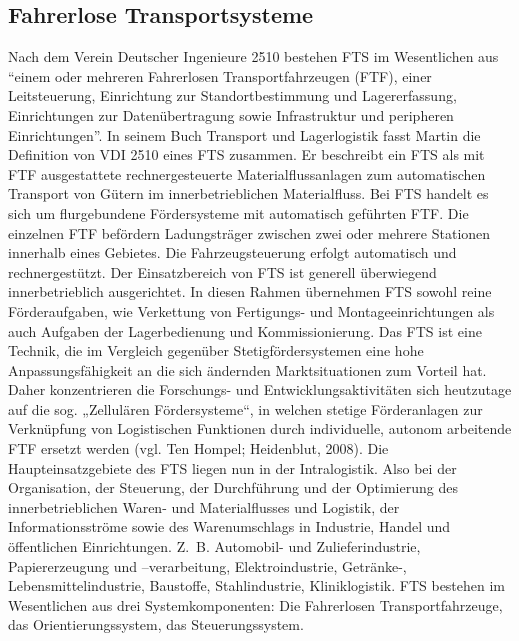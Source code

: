 \subsection{Fahrerlose Transportsysteme}
Nach dem Verein Deutscher Ingenieure 2510 bestehen FTS im Wesentlichen aus "`einem oder mehreren 
Fahrerlosen Transportfahrzeugen (FTF), einer Leitsteuerung, Einrichtung zur Standortbestimmung und 
Lagererfassung, Einrichtungen zur Daten\"ubertragung sowie Infrastruktur und peripheren Einrichtungen"'. 
In seinem Buch Transport und Lagerlogistik fasst Martin die Definition von VDI 2510 eines FTS zusammen.
Er beschreibt ein FTS als mit FTF ausgestattete rechnergesteuerte Materialflussanlagen zum automatischen 
Transport von G\"utern im innerbetrieblichen Materialfluss\cite[vgl.][S. 262f]{Martin:2006}. Bei FTS handelt 
es sich um flurgebundene F\"ordersysteme mit automatisch gef\"uhrten FTF. Die einzelnen FTF bef\"ordern 
Ladungstr\"ager zwischen zwei oder mehrere Stationen innerhalb eines Gebietes. Die Fahrzeugsteuerung erfolgt 
automatisch und rechnergest\"utzt. Der Einsatzbereich von FTS ist generell \"uberwiegend innerbetrieblich 
ausgerichtet. In diesen Rahmen \"ubernehmen FTS sowohl reine F\"orderaufgaben, wie Verkettung von Fertigungs- 
und Montageeinrichtungen als auch Aufgaben der Lagerbedienung und Kommissionierung\cite[vgl.][S. 3]{Guenther:Krueger:2000}. 
Das FTS ist eine Technik, die im Vergleich gegen\"uber Stetigf\"ordersystemen eine hohe Anpassungsf\"ahigkeit an die 
sich \"andernden Marktsituationen zum Vorteil hat. Daher konzentrieren die Forschungs- und Entwicklungsaktivit\"aten 
sich heutzutage auf die sog. „Zellul\"aren F\"ordersysteme“, in welchen stetige F\"orderanlagen zur Verkn\"upfung von 
Logistischen Funktionen durch individuelle, autonom arbeitende FTF ersetzt werden (vgl. Ten Hompel; Heidenblut, 2008). 
Die Haupteinsatzgebiete des FTS liegen nun in der Intralogistik. Also bei der Organisation, der Steuerung, 
der Durchf\"uhrung und der Optimierung des innerbetrieblichen Waren- und Materialflusses und Logistik, 
der Informationsstr\"ome sowie des Warenumschlags in Industrie, Handel und \"offentlichen Einrichtungen. 
Z.~B. Automobil- und Zulieferindustrie, Papiererzeugung und –verarbeitung, Elektroindustrie, Getr\"anke-, 
Lebensmittelindustrie, Baustoffe, Stahlindustrie, Kliniklogistik\cite[vgl.][S. 13]{Guenther:2011}. FTS bestehen 
im Wesentlichen aus drei Systemkomponenten: Die Fahrerlosen Transportfahrzeuge, das Orientierungssystem, das Steuerungssystem. 

